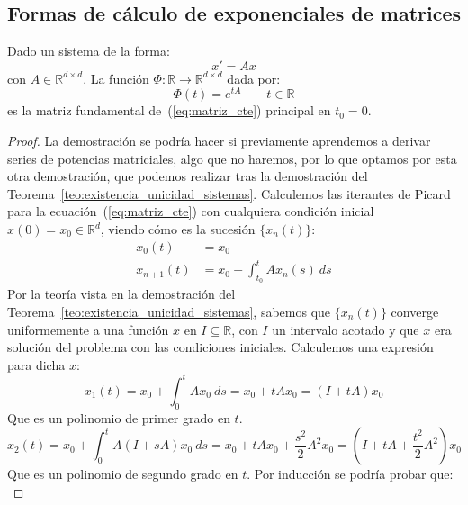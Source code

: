\subsection{Formas de cálculo de exponenciales de matrices}
\begin{prop}\label{prop:equiv_exp_ec}
    Dado un sistema de la forma:
    \begin{equation}\label{eq:matriz_cte}
        x' = Ax
    \end{equation}
    con $A\in \mathbb{R}^{d\times d}$. La función $\Phi:\mathbb{R}\rightarrow\mathbb{R}^{d\times d}$ dada por:
    \begin{equation*}
        \Phi(t) = e^{tA} \qquad t\in \mathbb{R}
    \end{equation*}
    es la matriz fundamental de~(\ref{eq:matriz_cte}) principal en $t_0 = 0$.
    \begin{proof}
        La demostración se podría hacer si previamente aprendemos a derivar series de potencias matriciales, algo que no haremos, por lo que optamos por esta otra demostración, que podemos realizar tras la demostración del Teorema~\ref{teo:existencia_unicidad_sistemas}.
        Calculemos las iterantes de Picard para la ecuación~(\ref{eq:matriz_cte}) con cualquiera condición inicial $x(0) = x_0\in \mathbb{R}^d$, viendo cómo es la sucesión $\{x_n(t)\}$:
        \begin{align*}
            x_0(t) &= x_0 \\
            x_{n+1}(t) &= x_0 + \int_{t_0}^{t} Ax_n(s)~ds 
        \end{align*}
        Por la teoría vista en la demostración del Teorema~\ref{teo:existencia_unicidad_sistemas}, sabemos que $\{x_n(t)\}$ converge uniformemente a una función $x$ en $I\subseteq \mathbb{R}$, con $I$ un intervalo acotado y que $x$ era solución del problema con las condiciones iniciales. Calculemos una expresión para dicha $x$:
        \begin{equation*}
            x_1(t) = x_0 + \int_{0}^{t} Ax_0~ds  = x_0 + tAx_0 = (I+tA)x_0
        \end{equation*}
        Que es un polinomio de primer grado en $t$.
        \begin{equation*}
            x_2(t) = x_0 + \int_{0}^{t} A(I+sA)x_0~ds = x_0 + tAx_0 + \dfrac{s^2}{2}A^2 x_0 = \left(I+tA+\dfrac{t^2}{2}A^2\right)x_0
        \end{equation*}
        Que es un polinomio de segundo grado en $t$. Por inducción se podría probar que:
        \begin{equation*}

\end{equation*}
\end{proof}
\end{prop}
